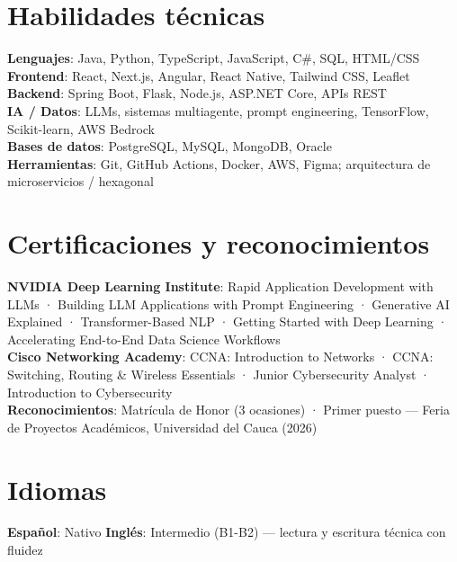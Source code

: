 \documentclass[letterpaper,11pt]{article}
\begin{document}
\section{Habilidades técnicas}
 \begin{itemize}[leftmargin=0.15in, label={}]
    \small{\item{
     \textbf{Lenguajes}{: Java, Python, TypeScript, JavaScript, C\#, SQL, HTML/CSS} \\
     \textbf{Frontend}{: React, Next.js, Angular, React Native, Tailwind CSS, Leaflet} \\
     \textbf{Backend}{: Spring Boot, Flask, Node.js, ASP.NET Core, APIs REST} \\
     \textbf{IA / Datos}{: LLMs, sistemas multiagente, prompt engineering, TensorFlow, Scikit-learn, AWS Bedrock} \\
     \textbf{Bases de datos}{: PostgreSQL, MySQL, MongoDB, Oracle} \\
     \textbf{Herramientas}{: Git, GitHub Actions, Docker, AWS, Figma; arquitectura de microservicios / hexagonal}
    }}
 \end{itemize}

\section{Certificaciones y reconocimientos}
 \begin{itemize}[leftmargin=0.15in, label={}]
    \small{\item{
     \textbf{NVIDIA Deep Learning Institute}{: Rapid Application Development with LLMs · Building LLM Applications with Prompt Engineering · Generative AI Explained · Transformer-Based NLP · Getting Started with Deep Learning · Accelerating End-to-End Data Science Workflows} \\
     \textbf{Cisco Networking Academy}{: CCNA: Introduction to Networks · CCNA: Switching, Routing \& Wireless Essentials · Junior Cybersecurity Analyst · Introduction to Cybersecurity} \\
     \textbf{Reconocimientos}{: Matrícula de Honor (3 ocasiones) · Primer puesto — Feria de Proyectos Académicos, Universidad del Cauca (2026)}
    }}
 \end{itemize}

\section{Idiomas}
 \begin{itemize}[leftmargin=0.15in, label={}]
    \small{\item{
     \textbf{Español}{: Nativo} \hspace{18pt} \textbf{Inglés}{: Intermedio (B1-B2) — lectura y escritura técnica con fluidez}
    }}
 \end{itemize}

\end{document}

